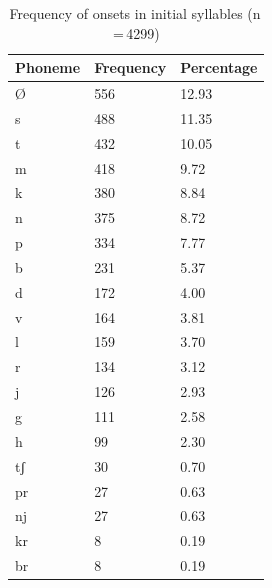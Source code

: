 \begin{table}[pth]\centering
\caption[Frequency of onsets in initial syllables]{Frequency of onsets in 
initial syllables (n\,=\,4299)}
\begin{tabu} to 0.5\linewidth{X X[c] X[c]}
\tableheaderfont\toprule
Phoneme
	& Frequency
	& Percentage
	\\
	
\toprule

Ø
	& 556
	& 12.93\pct
	\\

\midrule

s
	& 488
	& 11.35\pct
	\\

t
	& 432
	& 10.05\pct
	\\

m
	& 418
	& 9.72\pct
	\\

k
	& 380
	& 8.84\pct
	\\

n
	& 375
	& 8.72\pct
	\\

p
	& 334
	& 7.77\pct
	\\

b
	& 231
	& 5.37\pct
	\\

d
	& 172
	& 4.00\pct
	\\

v
	& 164
	& 3.81\pct
	\\

l
	& 159
	& 3.70\pct
	\\

r
	& 134
	& 3.12\pct
	\\

j
	& 126
	& 2.93\pct
	\\

g
	& 111
	& 2.58\pct
	\\

h
	& 99
	& 2.30\pct
	\\

tʃ
	& 30
	& 0.70\pct
	\\

pr
	& 27
	& 0.63\pct
	\\

nj
	& 27
	& 0.63\pct
	\\

kr
	& 8
	& 0.19\pct
	\\

br
	& 8
	& 0.19\pct
	\\


\end{tabu}
\end{table}
